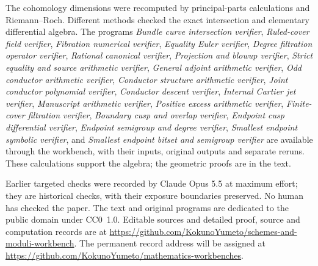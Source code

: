 \documentclass[11pt]{article}
\theoremstyle{remark}\newtheorem{remark}[theorem]{Remark}
\newcommand{\workbenchurl}{https://github.com/KokunoYumeto/schemes-and-moduli-workbench}
\newcommand{\recordurl}{https://github.com/KokunoYumeto/mathematics-workbenches}
\begin{document}
The cohomology dimensions were recomputed by principal-parts calculations
and Riemann--Roch. Different methods checked the exact intersection and
elementary differential algebra. The programs \emph{Bundle curve intersection
verifier}, \emph{Ruled-cover field verifier}, \emph{Fibration numerical
verifier}, \emph{Equality Euler verifier}, \emph{Degree filtration operator
verifier}, \emph{Rational canonical verifier}, \emph{Projection and blowup
verifier}, \emph{Strict equality and source arithmetic verifier},
\emph{General adjoint arithmetic verifier}, \emph{Odd conductor arithmetic
verifier}, \emph{Conductor structure arithmetic verifier},
\emph{Joint conductor polynomial verifier}, \emph{Conductor descent verifier},
\emph{Internal Cartier jet verifier}, \emph{Manuscript arithmetic verifier},
\emph{Positive excess arithmetic verifier},
\emph{Finite-cover filtration verifier},
\emph{Boundary cusp and overlap verifier},
\emph{Endpoint cusp differential verifier},
\emph{Endpoint semigroup and degree verifier},
\emph{Smallest endpoint symbolic verifier}, and
\emph{Smallest endpoint bitset and semigroup verifier}
are available through the
workbench, with their inputs, original outputs and separate reruns.
These calculations support the algebra; the geometric proofs are in the text.

Earlier targeted checks were recorded by Claude Opus 5.5 at maximum effort;
they are historical checks, with their exposure boundaries preserved.
No human has checked the paper. The text and original programs are dedicated
to the public domain under CC0~1.0. Editable sources and detailed proof,
source and computation records are at \url{\workbenchurl}.
The \mbox{permanent} record address will be assigned at
\url{\recordurl}.
\end{document}
